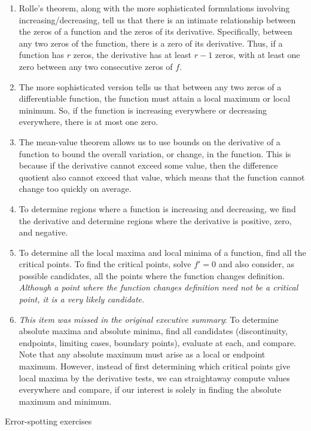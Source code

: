 \documentclass[10pt]{amsart}
\begin{document}
\begin{enumerate}
\item Rolle's theorem, along with the more sophisticated formulations
  involving increasing/decreasing, tell us that there is an intimate
  relationship between the zeros of a function and the zeros of its
  derivative. Specifically, between any two zeros of the function,
  there is a zero of its derivative. Thus, if a function has $r$
  zeros, the derivative has at least $r - 1$ zeros, with at least one
  zero between any two consecutive zeros of $f$.
\item The more sophisticated version tells us that between any two
  zeros of a differentiable function, the function must attain a local
  maximum or local minimum. So, if the function is increasing
  everywhere or decreasing everywhere, there is at most one zero.
\item The mean-value theorem allows us to use bounds on the derivative
  of a function to bound the overall variation, or change, in the
  function. This is because if the derivative cannot exceed some
  value, then the difference quotient also cannot exceed that value,
  which means that the function cannot change too quickly on average.
\item To determine regions where a function is increasing and
  decreasing, we find the derivative and determine regions where the
  derivative is positive, zero, and negative.
\item To determine all the local maxima and local minima of a
  function, find all the critical points. To find the critical points,
  solve $f' = 0$ and also consider, as possible candidates, all the
  points where the function changes definition. {\em Although a point
  where the function changes definition need not be a critical point,
  it is a very likely candidate.}
\item {\em This item was missed in the original executive summary}: To
  determine absolute maxima and absolute minima, find all candidates
  (discontinuity, endpoints, limiting cases, boundary points),
  evaluate at each, and compare. Note that any absolute maximum must
  arise as a local or endpoint maximum. However, instead of first
  determining which critical points give local maxima by the
  derivative tests, we can straightaway compute values everywhere and
  compare, if our interest is solely in finding the absolute maximum
  and minimum.
\end{enumerate}

Error-spotting exercises
\end{document}
